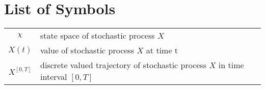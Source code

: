 \chapter*{List of Symbols}

\begin{tabular}{cp{}}
	$ \rchi $ & state space of stochastic process $ X $ \\
	$ X(t) $ & value of stochastic process $X$ at time t \\
	$ X^{[0, T]} $ & discrete valued trajectory of stochastic process $ X $ in time interval $ [0, T] $ \\
\end{tabular}\\
